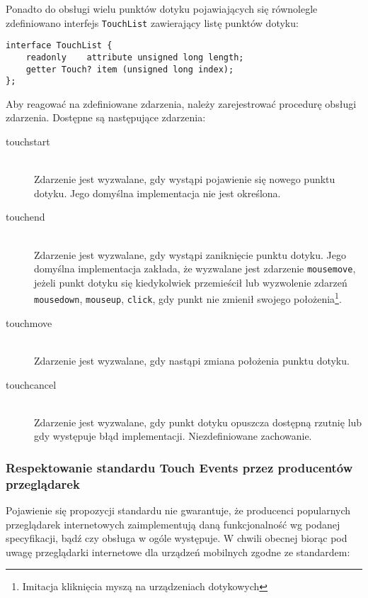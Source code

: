 Ponadto do obsługi wielu punktów dotyku pojawiających się równolegle zdefiniowano interfejs \lstinline{TouchList} zawierający listę punktów dotyku:

\lstset{language=Octave}
\begin{lstlisting}
interface TouchList {
    readonly    attribute unsigned long length;
    getter Touch? item (unsigned long index);
};
\end{lstlisting}

Aby reagować na zdefiniowane zdarzenia, należy zarejestrować procedurę obsługi zdarzenia. Dostępne są następujące zdarzenia:

\begin{description}
  \item[touchstart] \hfill \\
  Zdarzenie jest wyzwalane, gdy wystąpi pojawienie się nowego punktu dotyku. Jego domyślna implementacja nie jest określona.
  \item[touchend] \hfill \\
  Zdarzenie jest wyzwalane, gdy wystąpi zaniknięcie punktu dotyku. Jego domyślna implementacja zakłada, że wyzwalane jest zdarzenie \lstinline{mousemove}, jeżeli punkt dotyku się kiedykolwiek przemieścił lub wyzwolenie zdarzeń \lstinline{mousedown}, \lstinline{mouseup}, \lstinline{click}, gdy punkt nie zmienił swojego położenia\footnote{Imitacja kliknięcia myszą na urządzeniach dotykowych}.
  \item[touchmove] \hfill \\
  Zdarzenie jest wyzwalane, gdy nastąpi zmiana położenia punktu dotyku.
  \item[touchcancel] \hfill \\
  Zdarzenie jest wyzwalane, gdy punkt dotyku opuszcza dostępną rzutnię lub gdy występuje błąd implementacji. Niezdefiniowane zachowanie.
\end{description}

\subsubsection{Respektowanie standardu Touch Events przez producentów przeglądarek}
\label{subsec:w3c-touch-events-implementations}

Pojawienie się propozycji standardu nie gwarantuje, że producenci popularnych przeglądarek internetowych zaimplementują daną funkcjonalność wg podanej specyfikacji, bądź czy obsługa w ogóle występuje. W chwili obecnej biorąc pod uwagę przeglądarki internetowe dla urządzeń mobilnych zgodne ze standardem\cite{caniuse-touch-events}:

